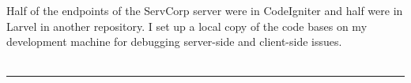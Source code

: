 \documentclass{article}
\begin{document}

Half of the endpoints of the ServCorp server were in CodeIgniter and half were in Larvel in another repository. I set up a local copy of the code bases on my development machine for debugging server-side and client-side issues.\ 
\\
\\

\noindent\hfil\rule{0.5\textwidth}{.4pt}\hfil
\\

\end{document}
